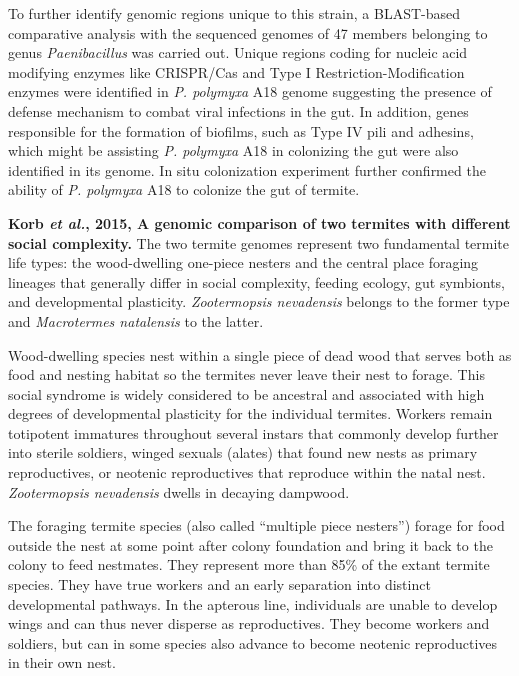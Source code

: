 \documentclass[11pt]{article}
\begin{document}
\begin{sloppypar}
To further identify genomic regions unique to this strain, a BLAST-based comparative analysis with the sequenced genomes of 47 members belonging to genus \textit{Paenibacillus} was carried out. 
Unique regions coding for nucleic acid modifying enzymes like CRISPR/Cas and Type I Restriction-Modification enzymes were identified in \textit{P. polymyxa} A18 genome suggesting the presence of defense mechanism to combat viral infections in the gut. 
In addition, genes responsible for the formation of biofilms, such as Type IV pili and adhesins, which might be assisting \textit{P. polymyxa} A18 in colonizing the gut were also identified in its genome. 
In situ colonization experiment further confirmed the ability of \textit{P. polymyxa} A18 to colonize the gut of termite. 
\par
\textbf{Korb \textit{et al.}, 2015, A genomic comparison of two termites with different social complexity.} \newline
The two termite genomes represent two fundamental termite life types: the wood-dwelling one-piece nesters and the central place foraging lineages that generally differ in social complexity, feeding ecology, gut symbionts, and developmental plasticity. 
\textit{Zootermopsis nevadensis} belongs to the former type and \textit{Macrotermes natalensis} to the latter. 
\par
Wood-dwelling species nest within a single piece of dead wood that serves both as food and nesting habitat so the termites never leave their nest to forage. 
This social syndrome is widely considered to be ancestral and associated with high degrees of developmental plasticity for the individual termites. 
Workers remain totipotent immatures throughout several instars that commonly develop further into sterile soldiers, winged sexuals (alates) that found new nests as primary reproductives, or neotenic reproductives that reproduce within the natal nest. 
\textit{Zootermopsis nevadensis} dwells in decaying dampwood. 
\par
The foraging termite species (also called “multiple piece nesters”) forage for food outside the nest at some point after colony foundation and bring it back to the colony to feed nestmates. 
They represent more than 85\% of the extant termite species. 
They have true workers and an early separation into distinct developmental pathways. 
In the apterous line, individuals are unable to develop wings and can thus never disperse as reproductives. They become workers and soldiers, but can in some species also advance to become neotenic reproductives in their own nest. 

\end{sloppypar}
\end{document}
